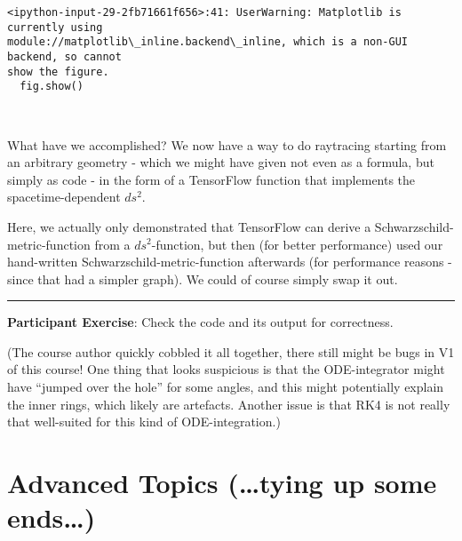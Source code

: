 \documentclass[11pt]{article}
\begin{document}
    \begin{Verbatim}[commandchars=\\\{\}]
<ipython-input-29-2fb71661f656>:41: UserWarning: Matplotlib is currently using
module://matplotlib\_inline.backend\_inline, which is a non-GUI backend, so cannot
show the figure.
  fig.show()
    \end{Verbatim}

    \begin{center}
    \end{center}
    { \hspace*{\fill} \\}
    
    What have we accomplished? We now have a way to do raytracing starting
from an arbitrary geometry - which we might have given not even as a
formula, but simply as code - in the form of a TensorFlow function that
implements the spacetime-dependent \(ds^2\).

Here, we actually only demonstrated that TensorFlow can derive a
Schwarzschild-metric-function from a \(ds^2\)-function, but then (for
better performance) used our hand-written Schwarzschild-metric-function
afterwards (for performance reasons - since that had a simpler graph).
We could of course simply swap it out.

\begin{center}\rule{0.5\linewidth}{0.5pt}\end{center}

\textbf{Participant Exercise}: Check the code and its output for
correctness.

(The course author quickly cobbled it all together, there still might be
bugs in V1 of this course! One thing that looks suspicious is that the
ODE-integrator might have ``jumped over the hole'' for some angles, and
this might potentially explain the inner rings, which likely are
artefacts. Another issue is that RK4 is not really that well-suited for
this kind of ODE-integration.)


    
    
    

    
    
    
    

    
    \hypertarget{advanced-topics-tying-up-some-ends}{%
\section{Advanced Topics (\ldots tying up some
ends\ldots)}\label{advanced-topics-tying-up-some-ends}}
\end{document}
